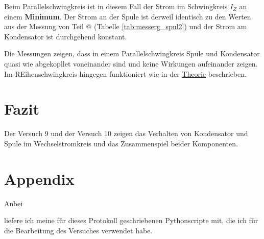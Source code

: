 \documentclass[10pt,a4paper]{article}
\makeatletter
\newcommand*{\rom}[1]{\expandafter\@slowromancap\romannumeral #1@}
\makeatother
\begin{document}
\begin{flushleft}
\begin{itemize}
Beim Parallelschwingkreis ist in diesem Fall der Strom im Schwingkreis $I_Z$ an einem \textbf{Minimum}. Der Strom an der Spule ist derweil identisch zu den Werten aus der Messung von Teil \rom{2} (Tabelle \ref{tab:messerg_spul2}) und der Strom am Kondensator ist durchgehend konstant.

Die Messungen zeigen, dass in einem Parallelschwingkreis Spule und Kondensator quasi wie abgekopllet voneinander sind und keine Wirkungen aufeinander zeigen. Im REihenschwingkreis hingegen funktioniert wie in der \hyperlink{theo-res}{Theorie} beschrieben.
\end{itemize}
\end{flushleft}

\section{Fazit}
\begin{flushleft}
Der Versuch 9 und der Versuch 10 zeigen das Verhalten von Kondensator und Spule im Wechselstromkreis und das Zusammenspiel beider Komponenten.
%
%
\end{flushleft}

\begingroup
\raggedright
\sloppy
\printbibliography[heading=bibintoc,title={6 \hspace{6pt} Literatur}]
\endgroup

\newpage

\section*{Appendix}
\begin{flushleft}
\hypertarget{sec:appendix}{Anbei} liefere ich meine für dieses Protokoll geschriebenen Pythonscripte mit, die ich für die Bearbeitung des Versuches verwendet habe.
\end{flushleft}
\end{document}
